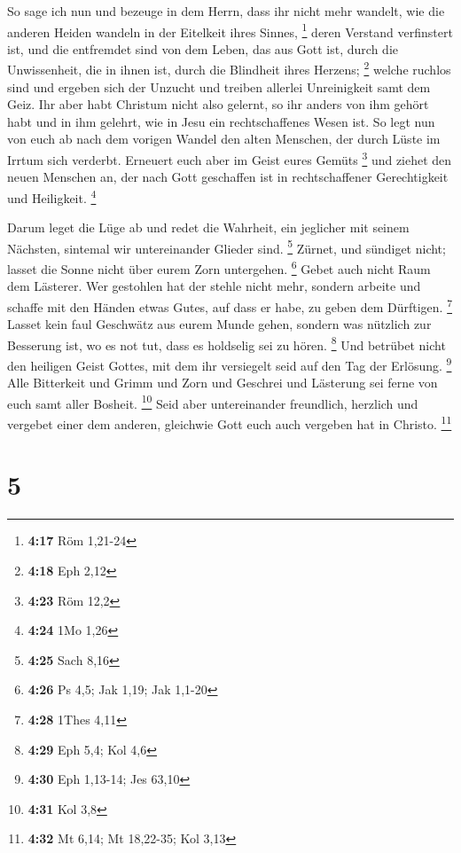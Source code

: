  So sage ich nun und bezeuge in dem Herrn, dass ihr nicht
mehr wandelt, wie die anderen Heiden wandeln in der Eitelkeit ihres
Sinnes, \footnote{\textbf{4:17} Röm 1,21-24}  deren
Verstand verfinstert ist, und die entfremdet sind von dem Leben, das aus
Gott ist, durch die Unwissenheit, die in ihnen ist, durch die Blindheit
ihres Herzens; \footnote{\textbf{4:18} Eph 2,12}  welche
ruchlos sind und ergeben sich der Unzucht und treiben allerlei
Unreinigkeit samt dem Geiz.  Ihr aber habt Christum nicht
also gelernt,  so ihr anders von ihm gehört habt und in
ihm gelehrt, wie in Jesu ein rechtschaffenes Wesen ist. 
So legt nun von euch ab nach dem vorigen Wandel den alten Menschen, der
durch Lüste im Irrtum sich verderbt.  Erneuert euch aber
im Geist eures Gemüts \footnote{\textbf{4:23} Röm 12,2} 
und ziehet den neuen Menschen an, der nach Gott geschaffen ist in
rechtschaffener Gerechtigkeit und Heiligkeit. \footnote{\textbf{4:24}
  1Mo 1,26}

 Darum leget die Lüge ab und redet die Wahrheit, ein
jeglicher mit seinem Nächsten, sintemal wir untereinander Glieder sind.
\footnote{\textbf{4:25} Sach 8,16}  Zürnet, und sündiget
nicht; lasset die Sonne nicht über eurem Zorn untergehen. \footnote{\textbf{4:26}
  Ps 4,5; Jak 1,19; Jak 1,1-20}  Gebet auch nicht Raum
dem Lästerer.  Wer gestohlen hat der stehle nicht mehr,
sondern arbeite und schaffe mit den Händen etwas Gutes, auf dass er
habe, zu geben dem Dürftigen. \footnote{\textbf{4:28} 1Thes 4,11}
 Lasset kein faul Geschwätz aus eurem Munde gehen,
sondern was nützlich zur Besserung ist, wo es not tut, dass es holdselig
sei zu hören. \footnote{\textbf{4:29} Eph 5,4; Kol 4,6} 
Und betrübet nicht den heiligen Geist Gottes, mit dem ihr versiegelt
seid auf den Tag der Erlösung. \footnote{\textbf{4:30} Eph 1,13-14; Jes
  63,10}  Alle Bitterkeit und Grimm und Zorn und Geschrei
und Lästerung sei ferne von euch samt aller Bosheit. \footnote{\textbf{4:31}
  Kol 3,8}  Seid aber untereinander freundlich, herzlich
und vergebet einer dem anderen, gleichwie Gott euch auch vergeben hat in
Christo. \footnote{\textbf{4:32} Mt 6,14; Mt 18,22-35; Kol 3,13}

\hypertarget{section-2}{%
\section{5}\label{section-2}}

